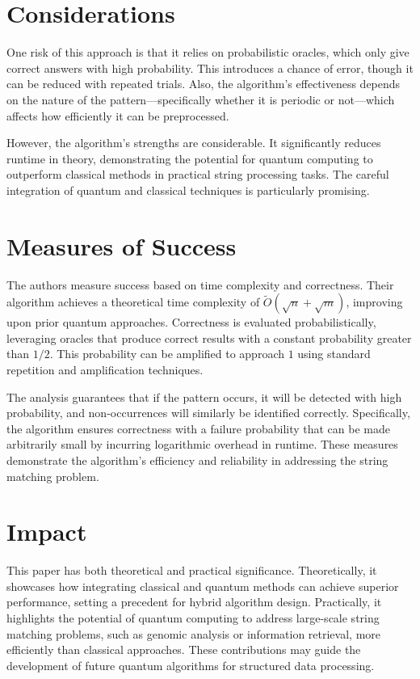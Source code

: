 \documentclass[12pt]{article}
\begin{document}
\section*{Considerations}
One risk of this approach is that it relies on probabilistic oracles, which only give correct answers with high probability. This introduces a chance of error, though it can be reduced with repeated trials. Also, the algorithm's effectiveness depends on the nature of the pattern—specifically whether it is periodic or not—which affects how efficiently it can be preprocessed.

However, the algorithm's strengths are considerable. It significantly reduces runtime in theory, demonstrating the potential for quantum computing to outperform classical methods in practical string processing tasks. The careful integration of quantum and classical techniques is particularly promising.

\section*{Measures of Success}
The authors measure success based on time complexity and correctness. Their algorithm achieves a theoretical time complexity of \(\tilde{O}(\sqrt{n} + \sqrt{m})\), improving upon prior quantum approaches. Correctness is evaluated probabilistically, leveraging oracles that produce correct results with a constant probability greater than \(1/2\). This probability can be amplified to approach \(1\) using standard repetition and amplification techniques.

The analysis guarantees that if the pattern occurs, it will be detected with high probability, and non-occurrences will similarly be identified correctly. Specifically, the algorithm ensures correctness with a failure probability that can be made arbitrarily small by incurring logarithmic overhead in runtime. These measures demonstrate the algorithm's efficiency and reliability in addressing the string matching problem.

\section*{Impact}
This paper has both theoretical and practical significance. Theoretically, it showcases how integrating classical and quantum methods can achieve superior performance, setting a precedent for hybrid algorithm design. Practically, it highlights the potential of quantum computing to address large-scale string matching problems, such as genomic analysis or information retrieval, more efficiently than classical approaches. These contributions may guide the development of future quantum algorithms for structured data processing.



\end{document}
